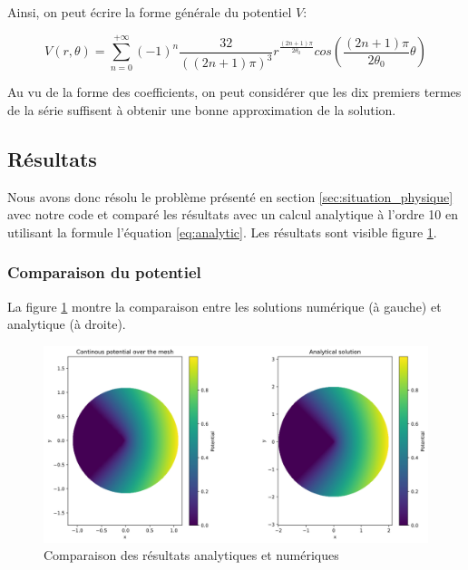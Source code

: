 \documentclass{article}
\begin{document}
Ainsi, on peut écrire la forme générale du potentiel $V$:

\begin{equation}
    V(r, \theta) = \sum_{n=0}^{+\infty}
    \left(-1\right)^n \frac{32}{
        \left((2n+1)\pi\right)^3}
    r^{\frac{(2n+1)\pi}{2 \theta_0}}
    cos\left(\frac{(2n+1)\pi}{2\theta_0}\theta\right)
    \label{eq:analytic}
\end{equation}

Au vu de la forme des coefficients, on peut considérer que 
les dix premiers termes de la série suffisent à obtenir une
bonne approximation de la solution.

\newpage

\subsection{Résultats}
\label{sec:results}

Nous avons donc résolu le problème présenté en section
\ref{sec:situation_physique} avec notre code et comparé
les résultats avec un calcul analytique à l'ordre 10
en utilisant la formule l'équation \ref{eq:analytic}.
Les résultats sont visible figure \ref{fig:analytic_vs_numeric}.

\subsubsection{Comparaison du potentiel}

La figure \ref{fig:analytic_vs_numeric} montre la comparaison
entre les solutions numérique (à gauche) et analytique (à droite).

\begin{figure}[!h]
    \centering
    \includegraphics[width=\textwidth]{img/comparison.png}
    \caption{Comparaison des résultats analytiques et numériques}
    \label{fig:analytic_vs_numeric}
\end{figure}
\end{document}
